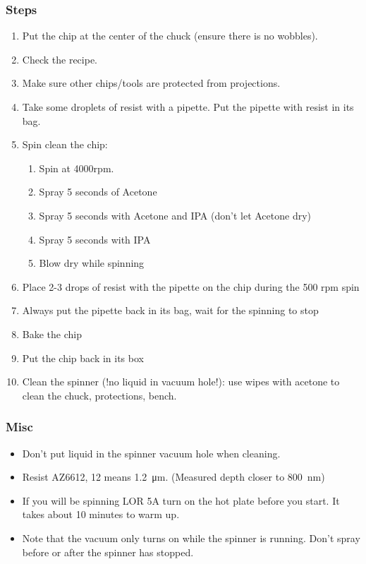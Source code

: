 \subsubsection{Steps}
\begin{enumerate}
\item Put the chip at the center of the chuck (ensure there is no wobbles).
\item Check the recipe.
\item Make sure other chips/tools are protected from projections.
\item Take some droplets of resist with a pipette. Put the pipette with resist in its bag.
\item Spin clean the chip:
\begin{enumerate}
\item Spin at 4000rpm.
\item Spray 5 seconds of Acetone
\item Spray 5 seconds with Acetone and IPA (don't let Acetone dry)
\item Spray 5 seconds with IPA
\item Blow dry while spinning
\end{enumerate}
\item Place 2-3 drops of resist with the pipette on the chip during the 500 rpm spin
\item Always put the pipette back in its bag, wait for the spinning to stop
\item Bake the chip
\item Put the chip back in its box
\item Clean the spinner (!no liquid in vacuum hole!): use wipes with acetone to clean the chuck, protections, bench.
\end{enumerate}

\subsubsection{Misc}
\begin{itemize}
\item Don't put liquid in the spinner vacuum hole when cleaning.
\item Resist AZ6612, 12 means \SI{1.2}{\micro\meter}. (Measured depth closer to \SI{800}{\nano\meter})
\item If you will be spinning LOR 5A turn on the hot plate before you start. It takes about 10 minutes to warm up.
\item Note that the vacuum only turns on while the spinner is running. Don't spray before or after the spinner has stopped.
\end{itemize}

\newpage

